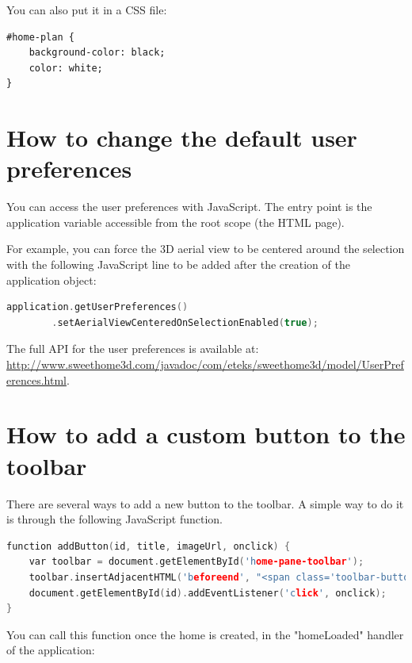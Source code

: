 \documentclass[a4paper]{report}
\begin{document}
You can also put it in a CSS file:

\begin{lstlisting}[language=html]
#home-plan {
	background-color: black; 
	color: white;
}         
\end{lstlisting}

\section{How to change the default user preferences}

You can access the user preferences with JavaScript. The entry point is the application variable accessible from the root scope (the HTML page).

For example, you can force the 3D aerial view to be centered around the selection with the following JavaScript line to be added after the creation of the application object:

\begin{lstlisting}[language=c++]
	application.getUserPreferences()
		.setAerialViewCenteredOnSelectionEnabled(true);
\end{lstlisting}

The full API for the user preferences is available at: \url{http://www.sweethome3d.com/javadoc/com/eteks/sweethome3d/model/UserPreferences.html}.

\section{How to add a custom button to the toolbar}

There are several ways to add a new button to the toolbar. A simple way to do it is through the following JavaScript function.

\begin{lstlisting}[language=c++]
function addButton(id, title, imageUrl, onclick) {
    var toolbar = document.getElementById('home-pane-toolbar');
    toolbar.insertAdjacentHTML('beforeend', "<span class='toolbar-button-group'><button title='"+title+"' class='toolbar-button toggle selected' id='"+id+"' style='background-image: url(&quot;"+imageUrl+"&quot;); background-position: center center; background-repeat: no-repeat;background-color:#fff'></button></span>");
    document.getElementById(id).addEventListener('click', onclick);
}
\end{lstlisting}

You can call this function once the home is created, in the "homeLoaded" handler of the application:
\end{document}
